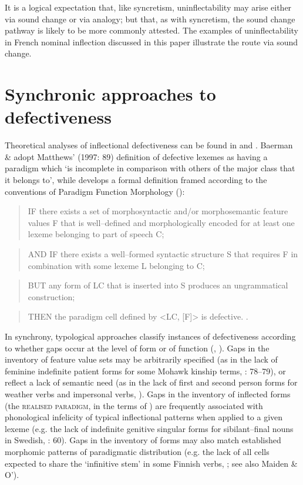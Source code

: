 \documentclass[output=paper]{langscibook}
\begin{document}
It is a logical expectation that, like syncretism, uninflectability may arise either via sound change or via analogy; but that, as with syncretism, the sound change pathway is likely to be more commonly attested. The examples of uninflectability in French nominal inflection discussed in this paper illustrate the route via sound change.

\section{Synchronic approaches to defectiveness}

Theoretical analyses of inflectional defectiveness can be found in \citet{BaermanCorbett2010} and \citet{Sims2015}. Baerman \& \citet[1]{Corbett2010} adopt Matthews’ (1997: 89) definition of defective lexemes as having a paradigm which ‘is incomplete in comparison with others of the major class that it belongs to’, while \citet[26]{Sims2015} develops a formal definition framed according to the conventions of Paradigm Function Morphology (\citealt{Stump2001,Stump2016}):

\begin{quote}
IF there exists a set of morphosyntactic and/or morphosemantic feature values F that is well–defined and morphologically encoded for at least one lexeme belonging to part of speech C;
\end{quote}

\begin{quote}
AND IF there exists a well–formed syntactic structure S that requires F in combination with some lexeme L belonging to C;
\end{quote}

\begin{quote}
BUT any form of LC that is inserted into S produces an ungrammatical construction;
\end{quote}

\begin{quote}
THEN the paradigm cell defined by <LC, [F]> is defective. \citep[26]{Sims2015}.
\end{quote}

In synchrony, typological approaches classify instances of defectiveness according to whether gaps occur at the level of form or of function (\citealt{BaermanCorbett2010}, \citealt{Sims2015}). Gaps in the inventory of feature value sets may be arbitrarily specified (as in the lack of feminine indefinite patient forms for some Mohawk kinship terms, \citealt{Sims2016}: 78–79), or reflect a lack of semantic need (as in the lack of first and second person forms for weather verbs and impersonal verbs, \citealt{BaermanCorbett2010}). Gaps in the inventory of inflected forms (the \textsc{realised} \textsc{paradigm}, in the terms of \citealt{Stump2016}) are frequently associated with phonological infelicity of typical inflectional patterns when applied to a given lexeme (e.g. the lack of indefinite genitive singular forms for sibilant–final nouns in Swedish, \citealt{Sims2015}: 60). Gaps in the inventory of forms may also match established morphomic patterns of paradigmatic distribution (e.g. the lack of all cells expected to share the ‘infinitive stem’ in some Finnish verbs, \citealt{BaermanCorbett2010}; see also Maiden \& O’\citealt{Neill2010}).
\end{document}
